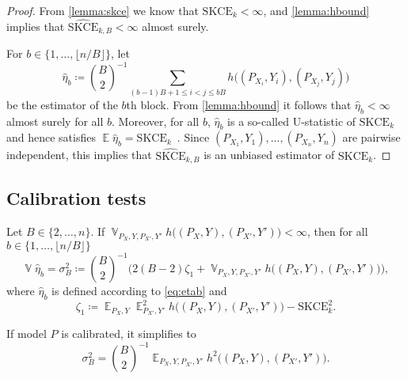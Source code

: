 \documentclass{article}
\DeclareMathOperator{\Exp}{\mathbb{E}}
\DeclareMathOperator{\Var}{\mathbb{V}}
\begin{document}
\lemmaskceblock*

\begin{proof}
From \cref{lemma:skce} we know that $\mathrm{SKCE}_k < \infty$,
and \cref{lemma:hbound} implies that
$\widehat{\mathrm{SKCE}}_{k,B} < \infty$ almost surely.

For $b \in \{1, \ldots, \lfloor n / B \rfloor\}$, let
\begin{equation}\label{eq:etab}
    \widehat{\eta}_b \coloneqq \binom{B}{2}^{-1} \sum_{(b - 1) B + 1 \leq i < j \leq bB} h\big((P_{X_{i}}, Y_i), (P_{X_j}, Y_j)\big)
\end{equation}
be the estimator of the $b$th block. From \cref{lemma:hbound} it follows
that $\widehat{\eta}_b < \infty$ almost surely for all $b$.
Moreover, for all $b$, $\widehat{\eta}_b$ is a so-called U-statistic of
$\mathrm{SKCE}_k$ and hence satisfies
$\Exp \widehat{\eta}_b = \mathrm{SKCE}_k$~\citep[see, e.g.,][]{Vaart1998}.
Since $(P_{X_1}, Y_1), \ldots, (P_{X_n}, Y_n)$ are pairwise independent,
this implies that $\widehat{\mathrm{SKCE}}_{k,B}$ is an unbiased
estimator of $\mathrm{SKCE}_k$.
\end{proof}

\subsection{Calibration tests}

\begin{lemma}\label{lemma:eta_variance}
    Let $B \in \{2, \ldots, n\}$.
    If $\Var_{P_X,Y,P_{X'},Y'} h\big((P_X, Y), (P_{X'}, Y')\big) < \infty$,
    then for all $b \in \{1, \ldots, \lfloor n / B \rfloor\}$
    \begin{equation*}
        \Var \widehat{\eta}_b = \sigma^2_B \coloneqq \binom{B}{2}^{-1} \Big(2(B - 2) \zeta_1
        + \Var_{P_X,Y,P_{X'},Y'} h\big((P_X, Y), (P_{X'}, Y')\big)\Big),
    \end{equation*}
    where $\widehat{\eta}_b$ is defined according to \cref{eq:etab} and
    \begin{equation}\label{eq:def_zeta1}
        \zeta_1 \coloneqq \Exp_{P_X,Y} \Exp^2_{P_{X'},Y'} h\big((P_X, Y), (P_{X'}, Y')\big) - \mathrm{SKCE}^2_k.
    \end{equation}

    If model $P$ is calibrated, it simplifies to
    \begin{equation*}
        \sigma^2_B = \binom{B}{2}^{-1} \Exp_{P_X,Y,P_{X'},Y'} h^2\big((P_X, Y), (P_{X'}, Y')\big).
    \end{equation*}
\end{lemma}
\end{document}
